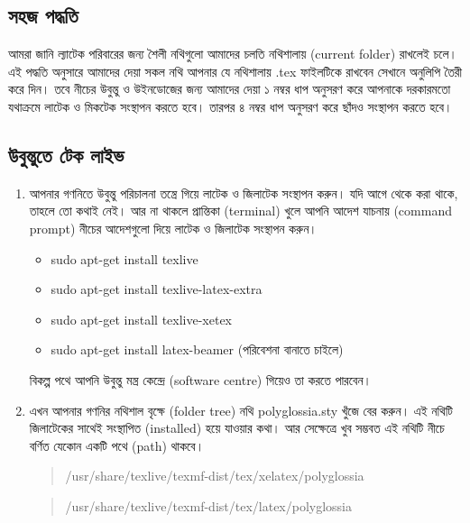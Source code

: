\documentclass[a4paper,10pt,xetex]{article}
\begin{document}
\subsection*{সহজ পদ্ধতি}
আমরা জানি ল্যাটেক পরিবারের জন্য শৈলী নথিগুলো আমাদের চলতি নথিশালায় (current folder) রাখলেই চলে। এই পদ্ধতি অনুসারে আমাদের দেয়া সকল নথি আপনার যে নথিশালায় .tex ফাইলটিকে রাখবেন সেখানে অনুলিপি তৈরী করে দিন। তবে নীচের উবুন্তু ও উইনডোজের জন্য আমাদের দেয়া ১ নম্বর ধাপ অনুসরণ করে আপনাকে দরকারমতো যথাক্রমে লাটেক ও মিকটেক সংস্থাপন করতে হবে। তারপর ৪ নম্বর ধাপ অনুসরণ করে ছাঁদও সংস্থাপন করতে হবে। 

\subsection*{উবুন্তুতে টেক লাইভ}

\begin{enumerate}
\item আপনার গণনিতে উবুন্তু পরিচালনা তন্ত্রে গিয়ে লাটেক ও জিলাটেক সংস্থাপন করুন। যদি আগে থেকে করা থাকে, তাহলে তো কথাই নেই। আর না থাকলে প্রান্তিকা (terminal) খুলে  আপনি আদেশ যাচনায় (command prompt) নীচের আদেশগুলো দিয়ে লাটেক ও জিলাটেক সংস্থাপন করুন। 
\begin{itemize}
\item sudo apt-get install texlive
\item sudo apt-get install texlive-latex-extra
\item sudo apt-get install texlive-xetex
\item sudo apt-get install latex-beamer (পরিবেশনা বানাতে চাইলে)
\end{itemize}

বিকল্প পথে আপনি উবুন্তু মন্ত্র কেন্দ্রে (software centre) গিয়েও তা করতে পারবেন।
\item এখন আপনার গণনির নথিশাল বৃক্ষে (folder tree) নথি polyglossia.sty খুঁজে বের করুন। এই নথিটি জিলাটেকের সাথেই সংস্থাপিত (installed) হয়ে যাওয়ার কথা। আর সেক্ষেত্রে খুব সম্ভবত এই নথিটি নীচে বর্ণিত যেকোন একটি পথে (path) থাকবে।
\begin{quote}/usr/share/texlive/texmf-dist/tex/xelatex/polyglossia\end{quote}
\begin{quote}/usr/share/texlive/texmf-dist/tex/latex/polyglossia\end{quote}


\end{enumerate}
\end{document}
